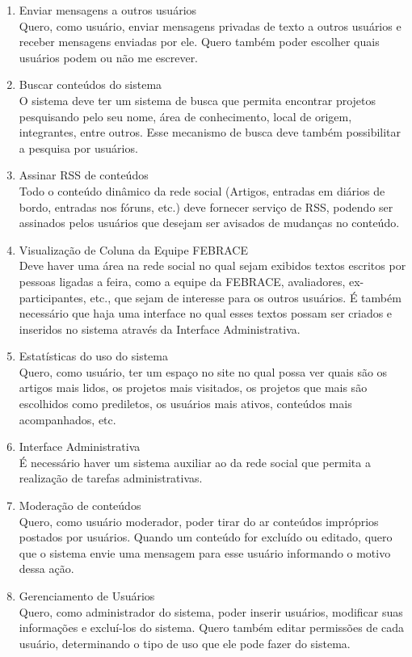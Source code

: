 \documentclass[a4paper,12pt,font=plain,header=plain]{abnt}
\begin{document}
\begin{enumerate}
	 \item Enviar mensagens a outros usuários \\
		Quero, como usuário, enviar mensagens privadas de texto a outros usuários e receber mensagens enviadas por ele. Quero também poder escolher quais usuários podem ou não me escrever.
	 \item Buscar conteúdos do sistema \\
		O sistema deve ter um sistema de busca que permita encontrar projetos pesquisando pelo seu nome, área de conhecimento, local de origem, integrantes, entre outros. Esse mecanismo de busca deve também possibilitar a pesquisa por usuários.
	 \item Assinar RSS de conteúdos \\
		Todo o conteúdo dinâmico da rede social (Artigos, entradas em diários de bordo, entradas nos fóruns, etc.) deve fornecer serviço de RSS, podendo ser assinados pelos usuários que desejam ser avisados de mudanças no conteúdo.
	 \item Visualização de Coluna da Equipe FEBRACE \\
		Deve haver uma área na rede social no qual sejam exibidos textos escritos por pessoas ligadas a feira, como a equipe da FEBRACE, avaliadores, ex-participantes, etc., que sejam de interesse para os outros usuários. É também necessário que haja uma interface no qual esses textos possam ser criados e inseridos no sistema através da Interface Administrativa.
	 \item Estatísticas do uso do sistema \\
		Quero, como usuário, ter um espaço no site no qual possa ver quais são os artigos mais lidos, os projetos mais visitados, os projetos que mais são escolhidos como prediletos, os usuários mais ativos, conteúdos mais acompanhados, etc.
	 \item Interface Administrativa \\
		É necessário haver um sistema auxiliar ao da rede social que permita a realização de tarefas administrativas.
	 \item Moderação de conteúdos \\
		Quero, como usuário moderador, poder tirar do ar conteúdos impróprios postados por usuários. Quando um conteúdo for excluído ou editado, quero que o sistema envie uma mensagem para esse usuário informando o motivo dessa ação.
	 \item Gerenciamento de Usuários \\
		Quero, como administrador do sistema, poder inserir usuários, modificar suas informações e excluí-los do sistema. Quero também editar permissões de cada usuário, determinando o tipo de uso que ele pode fazer do sistema.

\end{enumerate}
\end{document}
